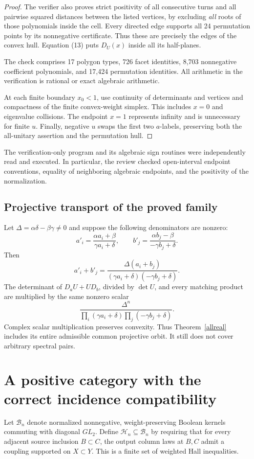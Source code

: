 \documentclass[11pt]{article}
\begin{document}
\begin{proof}
The verifier also proves strict positivity of all consecutive turns and all pairwise squared distances between the listed vertices, by excluding \emph{all} roots of those polynomials inside the cell. Every directed edge supports all 24 permutation points by its nonnegative certificate. Thus these are precisely the edges of the convex hull. Equation (13) puts $D_U(x)$ inside all its half-planes.

The check comprises 17 polygon types, 726 facet identities, 8,703 nonnegative coefficient polynomials, and 17,424 permutation identities. All arithmetic in the verification is rational or exact algebraic arithmetic.

At each finite boundary $x_0<1$, use continuity of determinants and vertices and compactness of the finite convex-weight simplex. This includes $x=0$ and eigenvalue collisions. The endpoint $x=1$ represents infinity and is unnecessary for finite $u$. Finally, negative $u$ swaps the first two $a$-labels, preserving both the all-unitary assertion and the permutation hull.
\end{proof}

The verification-only program and its algebraic sign routines were independently read and executed. In particular, the review checked open-interval endpoint conventions, equality of neighboring algebraic endpoints, and the positivity of the normalization.

\subsection{Projective transport of the proved family}
Let $\Delta=\alpha\delta-\beta\gamma\ne0$ and suppose the following denominators are nonzero:
\[
a'_i=\frac{\alpha a_i+\beta}{\gamma a_i+\delta},\qquad
b'_j=\frac{\alpha b_j-\beta}{-\gamma b_j+\delta}.
\]
Then
\[
a'_i+b'_j=
\frac{\Delta(a_i+b_j)}
 {(\gamma a_i+\delta)(-\gamma b_j+\delta)}.
\]
The determinant of $D_aU+UD_b$, divided by $\det U$, and every matching product are multiplied by the same nonzero scalar
\[
\frac{\Delta^n}
 {\prod_i(\gamma a_i+\delta)\prod_j(-\gamma b_j+\delta)}.
\]
Complex scalar multiplication preserves convexity. Thus Theorem~\ref{allreal} includes its entire admissible common projective orbit. It still does not cover arbitrary spectral pairs.

\section{A positive category with the correct incidence compatibility}
Let $\mathcal B_n$ denote normalized nonnegative, weight-preserving Boolean kernels commuting with diagonal $GL_2$. Define $\mathcal H_n\subseteq\mathcal B_n$ by requiring that for every adjacent source inclusion $B\subset C$, the output column laws at $B,C$ admit a coupling supported on $X\subset Y$. This is a finite set of weighted Hall inequalities.
\end{document}
